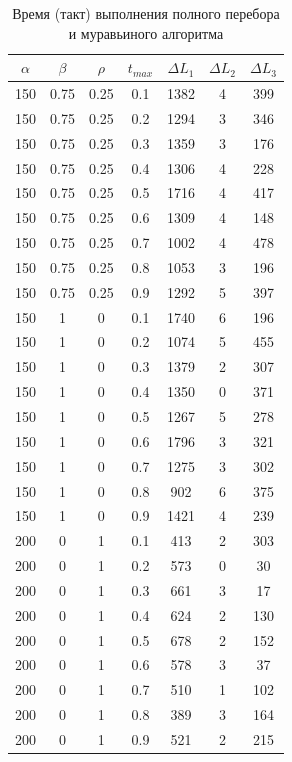 \documentclass[a4paper,oneside,14pt]{extreport}
\begin{document}
\begin{table}[h]
\caption{Время (такт) выполнения полного перебора и муравьиного алгоритма}
\label{tbl:only}
\begin{center}
	\begin{tabular}{|c|c|c|c|c|c|c|}
		\hline
		$\alpha$ & $\beta$ &$\rho$ &  $t_{max}$ & $\Delta L_{1}$ & $\Delta L_{2}$ & $\Delta L_{3}$\\
		\hline
		150 & 0.75 & 0.25 & 0.1 & 1382 & 4 & 399 \\
		150 & 0.75 & 0.25 & 0.2 & 1294 & 3 & 346 \\
		150 & 0.75 & 0.25 & 0.3 & 1359 & 3 & 176 \\
		150 & 0.75 & 0.25 & 0.4 & 1306 & 4 & 228 \\
		150 & 0.75 & 0.25 & 0.5 & 1716 & 4 & 417 \\
		150 & 0.75 & 0.25 & 0.6 & 1309 & 4 & 148 \\
		150 & 0.75 & 0.25 & 0.7 & 1002 & 4 & 478 \\
		150 & 0.75 & 0.25 & 0.8 & 1053 & 3 & 196 \\
		150 & 0.75 & 0.25 & 0.9 & 1292 & 5 & 397 \\
		150 & 1 & 0 & 0.1 & 1740 & 6 & 196 \\
		150 & 1 & 0 & 0.2 & 1074 & 5 & 455 \\
		150 & 1 & 0 & 0.3 & 1379 & 2 & 307 \\
		150 & 1 & 0 & 0.4 & 1350 & 0 & 371 \\
		150 & 1 & 0 & 0.5 & 1267 & 5 & 278 \\
		150 & 1 & 0 & 0.6 & 1796 & 3 & 321 \\
		150 & 1 & 0 & 0.7 & 1275 & 3 & 302 \\
		150 & 1 & 0 & 0.8 & 902 & 6 & 375 \\
		150 & 1 & 0 & 0.9 & 1421 & 4 & 239 \\
		200 & 0 & 1 & 0.1 & 413 & 2 & 303 \\
		200 & 0 & 1 & 0.2 & 573 & 0 & 30 \\
		200 & 0 & 1 & 0.3 & 661 & 3 & 17 \\
		200 & 0 & 1 & 0.4 & 624 & 2 & 130 \\
		200 & 0 & 1 & 0.5 & 678 & 2 & 152 \\
		200 & 0 & 1 & 0.6 & 578 & 3 & 37 \\
		200 & 0 & 1 & 0.7 & 510 & 1 & 102 \\
		200 & 0 & 1 & 0.8 & 389 & 3 & 164 \\
		200 & 0 & 1 & 0.9 & 521 & 2 & 215 \\

\end{tabular}
\end{center}
\end{table}
\end{document}
